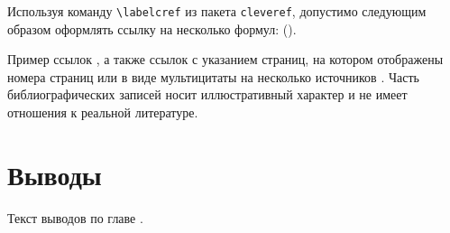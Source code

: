 Используя команду \verb|\labelcref| из пакета \verb|cleveref|, допустимо следующим образом оформлять ссылку на несколько формул:
().
%
%

Пример ссылок \cite{Article,Book,Booklet,Conference,Inbook,Incollection,Manual,Mastersthesis,Misc,Phdthesis,Proceedings,Techreport,Unpublished,badiou:briefings}, а также ссылок с указанием страниц, на котором отображены номера страниц  \cite[с.~96]{Naidenova2017} или в виде мультицитаты на несколько источников \cites[с.~96]{Naidenova2017}[с.~46]{Ganter1999}. Часть библиографических записей носит иллюстративный характер и не имеет отношения к реальной литературе. 




\section{Выводы} \label{ch1:conclusion}

Текст выводов по главе \thechapter.


%
